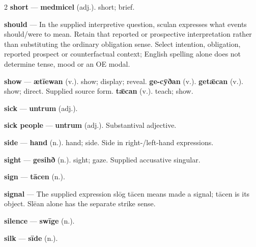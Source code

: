 \begin{multicols}{2}
\textbf{short} — \textbf{medmicel} (adj.). short; brief.\par
\textbf{should} — In the supplied interpretive question, sculan expresses what events should/were to mean. Retain that reported or prospective interpretation rather than substituting the ordinary obligation sense. Select intention, obligation, reported prospect or counterfactual context; English spelling alone does not determine tense, mood or an OE modal.\par
\textbf{show} — \textbf{ætīewan} (v.). show; display; reveal. \textbf{ge-cȳðan} (v.).  \textbf{getǣcan} (v.). show; direct. Supplied source form. \textbf{tǣcan} (v.). teach; show.\par
\textbf{sick} — \textbf{untrum} (adj.).\par
\textbf{sick people} — \textbf{untrum} (adj.). Substantival adjective.\par
\textbf{side} — \textbf{hand} (n.). hand; side. Side in right-/left-hand expressions.\par
\textbf{sight} — \textbf{gesihð} (n.). sight; gaze. Supplied accusative singular.\par
\textbf{sign} — \textbf{tācen} (n.).\par
\textbf{signal} — The supplied expression slōg tācen means made a signal; tācen is its object. Slēan alone has the separate strike sense.\par
\textbf{silence} — \textbf{swīge} (n.).\par
\textbf{silk} — \textbf{sīde} (n.).\par

\end{multicols}
